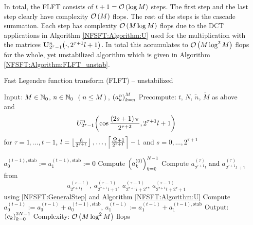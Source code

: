 In total, the FLFT consists of $t+1 = \mathcal{O}\left(\log M\right)$ steps. The first step and the last step clearly have complexity $\mathcal{O}\left(M\right)$ flops. The rest of the steps is the cascade summation. Each step has complexity $\mathcal{O}\left(M \log M\right)$ flops due to the DCT applications in Algorithm \ref{NFSFT:Algorithm:U} used for the multiplication with the matrices ${\mathbf{U}_{2^{\tau}-1}^{n}{\hspace{-0.4ex}}\left(\cdot,2^{\tau+1}l+1\right)}$. In total this accumulates to $\mathcal{O}\left(M \log^2 M\right)$ flops for the whole, yet unstabilized algorithm which is given in Algorithm 
\ref{NFSFT:Algorithm:FLFT_unstab}.

\begin{algorithm}[tb]
  \caption{Fast Legendre function transform (FLFT) -- unstabilized}
  \label{NFSFT:Algorithm:FLFT_unstab}    
  \begin{algorithmic}
    \STATE Input:  $M \in \mathbb{N}_{0}$, $n \in \mathbb{N}_{0}$ $(n \le M)$, $\left(a_k^n\right)_{k=n}^{M}$
    \STATE Precompute: $t$, $N$, $\tilde{n}$, $\tilde{M}$ as above and \[U_{2^{\tau}-1}^{n}{\hspace{-0.4ex}}\left(\cos \frac{\left(2s+1\right)\pi}{2^{\tau+2}}, 2^{\tau+1}l+1\right)\] 
    \STATE {} for $\tau = 1,\ldots,t-1$, $l = \left\lfloor\frac{\tilde{n}}{2^{\tau+1}}\right\rfloor,\ldots,\left\lceil\frac{\tilde{M}+1}{2^{\tau+1}}\right\rceil-1$ and $s = 0,\ldots,2^{\tau+1}$
    \STATE {} 

    \STATE $a_{0}^{(t-1),\text{stab}} := a_{1}^{(t-1),\text{stab}} := 0$
    \STATE Compute $\left(a_{k}^{(0)}\right)_{k=0}^{N-1}$ 
        \STATE Compute $a_{2^{\tau+1}l}^{(\tau)}$ and $a_{2^{\tau+1}l+1}^{(\tau)}$ from \[a_{2^{\tau+1}l}^{(\tau-1)},\  
          a_{2^{\tau+1}l+1}^{(\tau-1)},\ a_{2^{\tau+1}l+2^{\tau}}^{(\tau-1)},\ a_{2^{\tau+1}l+2^{\tau}+1}^{(\tau-1)}\] using 
          \eqref{NFSFT:GeneralStep} and Algorithm \ref{NFSFT:Algorithm:U}
      \ENDFOR
    \ENDFOR
    \STATE Compute $a_{0}^{(t-1)} := a_{0}^{(t-1)} + a_{0}^{(t-1),\text{stab}}$, $a_{1}^{(t-1)} := a_{1}^{(t-1)} + a_{1}^{(t-1),\text{stab}}$
    \STATE Output: $\left(c_{k}\right)_{k=0}^{2N-1}$
    \STATE Complexity: $\mathcal{O}\left(M \log^2 M\right)$ flops
\end{algorithmic}
\end{algorithm}

